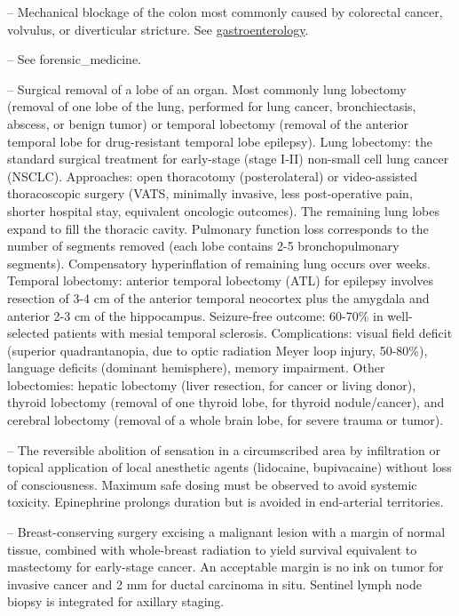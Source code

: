 -- Mechanical blockage of the colon most commonly caused by colorectal cancer, volvulus, or diverticular stricture. See \hyperlink{Gastroenterology}{gastroenterology}.

-- See forensic\_medicine.

-- Surgical removal of a lobe of an organ. Most commonly lung lobectomy (removal of one lobe of the lung, performed for lung cancer, bronchiectasis, abscess, or benign tumor) or temporal lobectomy (removal of the anterior temporal lobe for drug-resistant temporal lobe epilepsy). Lung lobectomy: the standard surgical treatment for early-stage (stage I-II) non-small cell lung cancer (NSCLC). Approaches: open thoracotomy (posterolateral) or video-assisted thoracoscopic surgery (VATS, minimally invasive, less post-operative pain, shorter hospital stay, equivalent oncologic outcomes). The remaining lung lobes expand to fill the thoracic cavity. Pulmonary function loss corresponds to the number of segments removed (each lobe contains 2-5 bronchopulmonary segments). Compensatory hyperinflation of remaining lung occurs over weeks. Temporal lobectomy: anterior temporal lobectomy (ATL) for epilepsy involves resection of 3-4 cm of the anterior temporal neocortex plus the amygdala and anterior 2-3 cm of the hippocampus. Seizure-free outcome: 60-70\% in well-selected patients with mesial temporal sclerosis. Complications: visual field deficit (superior quadrantanopia, due to optic radiation Meyer loop injury, 50-80\%), language deficits (dominant hemisphere), memory impairment. Other lobectomies: hepatic lobectomy (liver resection, for cancer or living donor), thyroid lobectomy (removal of one thyroid lobe, for thyroid nodule/cancer), and cerebral lobectomy (removal of a whole brain lobe, for severe trauma or tumor).

-- The reversible abolition of sensation in a circumscribed area by infiltration or topical application of local anesthetic agents (lidocaine, bupivacaine) without loss of consciousness. Maximum safe dosing must be observed to avoid systemic toxicity. Epinephrine prolongs duration but is avoided in end-arterial territories.

-- Breast-conserving surgery excising a malignant lesion with a margin of normal tissue, combined with whole-breast radiation to yield survival equivalent to mastectomy for early-stage cancer. An acceptable margin is no ink on tumor for invasive cancer and 2 mm for ductal carcinoma in situ. Sentinel lymph node biopsy is integrated for axillary staging.

